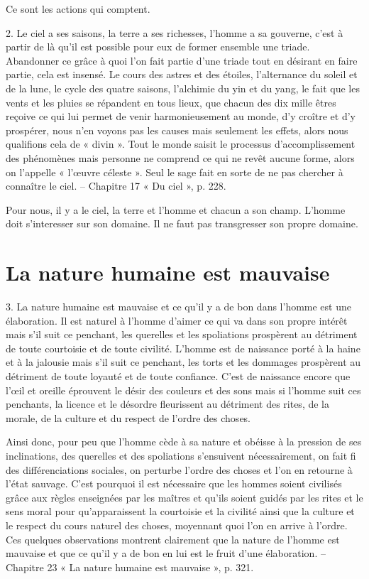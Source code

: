 Ce sont les actions qui comptent.


\begin{singlequote}
    2.	Le ciel a ses saisons, la terre a ses richesses, l’homme a sa gouverne, c’est à partir de là qu’il est possible pour eux de former ensemble une triade. Abandonner ce grâce à quoi l’on fait partie d’une triade tout en désirant en faire partie, cela est insensé. Le cours des astres et des étoiles, l’alternance du soleil et de la lune, le cycle des quatre saisons, l’alchimie du yin et du yang, le fait que les vents et les pluies se répandent en tous lieux, que chacun des dix mille êtres reçoive ce qui lui permet de venir harmonieusement au monde, d’y croître et d’y prospérer, nous n’en voyons pas les causes mais seulement les effets, alors nous qualifions cela de « divin ». Tout le monde saisit le processus d’accomplissement des phénomènes mais personne ne comprend ce qui ne revêt aucune forme, alors on l’appelle « l’œuvre céleste ». Seul le sage fait en sorte de ne pas chercher à connaître le ciel.
-- Chapitre 17 « Du ciel », p. 228.
\end{singlequote}

Pour nous, il y a le ciel, la terre et l'homme et chacun a son champ. L'homme doit s'interesser sur son domaine.
Il ne faut pas transgresser son propre domaine.

\section{La nature humaine est mauvaise}
\begin{singlequote}
    3.	La nature humaine est mauvaise et ce qu’il y a de bon dans l’homme est une élaboration. Il est naturel à l’homme d’aimer ce qui va dans son propre intérêt mais s’il suit ce penchant,
les querelles et les spoliations prospèrent au détriment de toute courtoisie et de toute civilité. L’homme est de naissance porté à la haine et à la jalousie mais s’il suit ce penchant, les torts et les dommages prospèrent au détriment de toute loyauté et de toute confiance. C’est de naissance encore que l’œil et oreille éprouvent le désir des couleurs et des sons mais si l’homme suit ces penchants, la licence et le désordre fleurissent au détriment des rites, de la morale, de la culture et du respect de l’ordre des choses.
 
Ainsi donc, pour peu que l’homme cède à sa nature et obéisse à la pression de ses inclinations, des querelles et des spoliations s’ensuivent nécessairement, on fait fi des différenciations sociales, on perturbe l’ordre des choses et l’on en retourne à l’état sauvage. C’est pourquoi il est nécessaire que les hommes soient civilisés grâce aux règles enseignées par les maîtres et qu’ils soient guidés par les rites et le sens moral pour qu’apparaissent la courtoisie et la civilité ainsi que la culture et le respect du cours naturel des choses, moyennant quoi l’on en arrive à l’ordre. Ces quelques observations montrent clairement que la nature de l’homme est mauvaise et que ce qu’il y a de bon en lui est le fruit d’une élaboration.
-- Chapitre 23 « La nature humaine est mauvaise », p. 321.

\end{singlequote}

